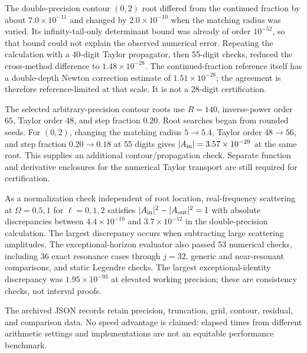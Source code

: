 The double-precision contour $(0,2)$ root differed from the continued fraction by about $7.0\times10^{-11}$ and changed by $2.0\times10^{-10}$ when the matching radius was varied. Its infinity-tail-only determinant bound was already of order $10^{-52}$, so that bound could not explain the observed numerical error. Repeating the calculation with a 40-digit Taylor propagator, then 55-digit checks, reduced the cross-method difference to $1.48\times10^{-28}$. The continued-fraction reference itself has a double-depth Newton correction estimate of $1.51\times10^{-28}$; the agreement is therefore reference-limited at that scale. It is not a 28-digit certification.

The selected arbitrary-precision contour roots use $R=140$, inverse-power order $65$, Taylor order $48$, and step fraction $0.20$. Root searches began from rounded seeds. For $(0,2)$, changing the matching radius $5\to5.4$, Taylor order $48\to56$, and step fraction $0.20\to0.18$ at 55 digits gives $|A_{\rm in}|=3.57\times10^{-29}$ at the same root. This supplies an additional contour/propagation check. Separate function and derivative enclosures for the numerical Taylor transport are still required for certification.

As a normalization check independent of root location, real-frequency scattering at $\Omega=0.5,1$ for $\ell=0,1,2$ satisfies $|A_{\rm in}|^2-|A_{\rm out}|^2=1$ with absolute discrepancies between $4.4\times10^{-16}$ and $3.7\times10^{-12}$ in the double-precision calculation. The largest discrepancy occurs when subtracting large scattering amplitudes. The exceptional-horizon evaluator also passed 53 numerical checks, including 36 exact resonance cases through $j=32$, generic and near-resonant comparisons, and static Legendre checks. The largest exceptional-identity discrepancy was $1.95\times10^{-93}$ at elevated working precision; these are consistency checks, not interval proofs.

The archived JSON records retain precision, truncation, grid, contour, residual, and comparison data. No speed advantage is claimed: elapsed times from different arithmetic settings and implementations are not an equitable performance benchmark.
